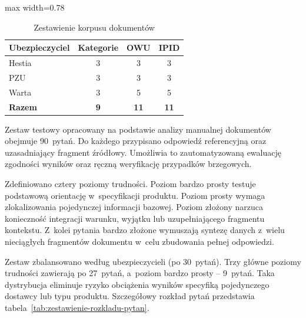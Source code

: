 \begin{table}[H]
  \caption{Zestawienie korpusu dokumentów}\label{tab:zestawienie-korpusu-dokumentow}
  \centering
  \small
  \begin{adjustbox}{max width=0.78\textwidth}
    \begin{tabular}{@{} l c c c @{}}
      \toprule
      \textbf{Ubezpieczyciel}
      & \textbf{Kategorie}
      & \textbf{OWU}
      & \textbf{IPID}                                  \\
      \midrule
      Hestia         & 3                  & 3           & 3           \\
      PZU            & 3                  & 3           & 3           \\
      Warta          & 3                  & 5           & 5           \\
      \midrule
      \textbf{Razem} & \textbf{9}         & \textbf{11} & \textbf{11} \\
      \bottomrule
    \end{tabular}
  \end{adjustbox}
\end{table}

Zestaw testowy opracowany na podstawie analizy manualnej dokumentów obejmuje
90~pytań. Do każdego przypisano odpowiedź referencyjną oraz uzasadniający
fragment źródłowy. Umożliwia to zautomatyzowaną ewaluację zgodności wyników
oraz ręczną weryfikację przypadków brzegowych.

Zdefiniowano cztery poziomy trudności. Poziom bardzo prosty testuje podstawową
orientację w~specyfikacji produktu. Poziom prosty wymaga zlokalizowania
pojedynczej informacji bazowej. Poziom złożony narzuca konieczność integracji
warunku, wyjątku lub uzupełniającego fragmentu kontekstu. Z~kolei pytania
bardzo złożone wymuszają syntezę danych z~wielu nieciągłych fragmentów
dokumentu w~celu zbudowania pełnej odpowiedzi.

Zestaw zbalansowano według ubezpieczycieli (po 30~pytań). Trzy główne poziomy
trudności zawierają po 27~pytań, a~poziom bardzo prosty – 9~pytań. Taka
dystrybucja eliminuje ryzyko obciążenia wyników specyfiką pojedynczego dostawcy
lub typu produktu. Szczegółowy rozkład pytań przedstawia
tabela~\ref{tab:zestawienie-rozkladu-pytan}.

